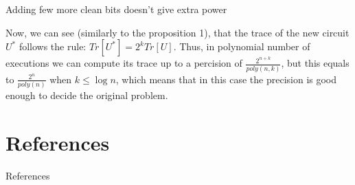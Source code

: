\documentclass[leqno,fleqn]{beamer}
\begin{document}
\begin{frame}[label={sec:orgheadline24}]{Adding few more clean bits doesn't give extra power}

Now, we can see (similarly to the proposition 1), that the trace of the new circuit \(U^*\) follows the rule: \(Tr[U^{*}] = 2^{k}Tr[U]\). Thus, in polynomial number of executions we can compute its trace up to a percision of \(\frac{2^{n+k}}{poly(n,k)}\), but this equals to \(\frac{2^{n}}{poly(n)}\) when \(k  \leq \log{n}\), which means that in this case the precision is good enough to decide the original problem.
\end{frame}

\section{References}
\label{sec:orgheadline27}
\begin{frame}[label={sec:orgheadline26}]{References}


\end{frame}
\end{document}
